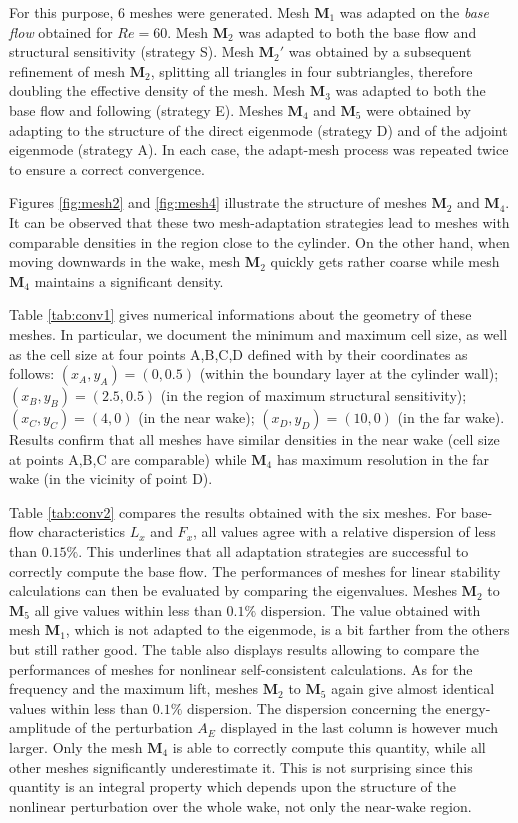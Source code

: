 \documentclass[twocolumn,10pt]{asme2ej}
\begin{document}
For this purpose, 6 meshes were generated. 
Mesh $\mathbf{M}_1$ was adapted on the {\em base flow} obtained for $Re=60$.
Mesh $\mathbf{M}_2$ was adapted to both the base flow and structural sensitivity (strategy S).
Mesh $\mathbf{M}_2'$ was obtained by a subsequent refinement of mesh $\mathbf{M}_2$, splitting all triangles in four subtriangles, therefore doubling the effective density of the mesh.
Mesh $\mathbf{M}_3$ was adapted to both the base flow and following \cite{mavripilis2015adjoint} (strategy E).
Meshes $\mathbf{M}_4$ and $\mathbf{M}_5$ were obtained by adapting to the structure of the direct eigenmode (strategy D) and of the adjoint eigenmode (strategy A). In each case, the adapt-mesh process was repeated twice to ensure a correct convergence.

Figures \ref{fig:mesh2} and \ref{fig:mesh4} illustrate the structure of meshes $\mathbf{M}_2$ and $\mathbf{M}_4$.
It can be observed that these two mesh-adaptation strategies lead to meshes with comparable densities in the region close to the cylinder.
On the other hand, when moving downwards in the wake, mesh $\mathbf{M}_2$ quickly gets rather coarse while mesh $\mathbf{M}_4$ maintains a significant density.

Table \ref{tab:conv1} gives numerical informations about the geometry of these meshes. In particular, we document the minimum and maximum cell size, as well as the cell size at four points A,B,C,D defined with by their coordinates as follows: $(x_A,y_A) = (0,0.5)$ (within the boundary layer at the cylinder wall); $(x_B,y_B) = (2.5,0.5)$ (in the region of maximum structural sensitivity); $(x_C,y_C) = (4,0)$ (in the near wake); $(x_D,y_D) = (10,0)$ (in the far wake).
Results confirm that all meshes have similar densities in the near wake (cell size at points A,B,C are comparable) while $\mathbf{M}_4$ has maximum resolution in the far wake (in the vicinity of point D).

Table \ref{tab:conv2} compares the results obtained with the six meshes.
For base-flow characteristics $L_x$ and $F_x$, all values agree with a relative dispersion of less than $0.15\%$.
This underlines that all adaptation strategies are successful to correctly compute the base flow. 
The performances of meshes for linear stability calculations can then be evaluated by comparing the eigenvalues.
Meshes $\mathbf{M}_2$ to $\mathbf{M}_5$ all give values within less than $0.1\%$ dispersion.
The value obtained with mesh $\mathbf{M}_1$, which is not adapted to the eigenmode, is a bit farther from the others but still rather good. The table also displays results allowing to compare the performances of meshes for nonlinear self-consistent calculations.
As for the frequency and the maximum lift, meshes $\mathbf{M}_2$ to $\mathbf{M}_5$ again give almost identical values within less than $0.1\%$ dispersion.
The dispersion concerning the energy-amplitude of the perturbation $A_E$ displayed in the last column is however much larger.
Only the mesh $\mathbf{M}_4$ is able to correctly compute this quantity, while all other meshes significantly underestimate it.
 This is not surprising since this quantity is an integral property which depends upon the structure of the nonlinear perturbation over the whole wake, not only the near-wake region.
\end{document}
